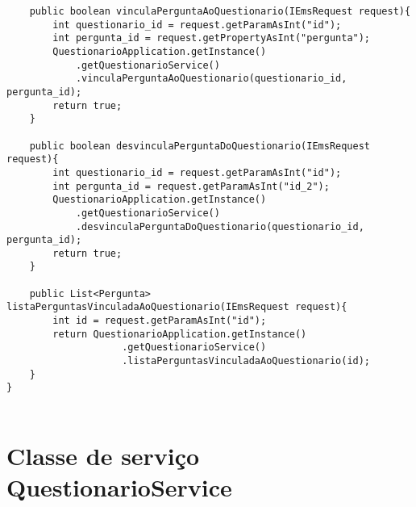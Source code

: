 \begin{lstlisting}
	public boolean vinculaPerguntaAoQuestionario(IEmsRequest request){
		int questionario_id = request.getParamAsInt("id");
		int pergunta_id = request.getPropertyAsInt("pergunta");
		QuestionarioApplication.getInstance()
			.getQuestionarioService()
			.vinculaPerguntaAoQuestionario(questionario_id, pergunta_id);
		return true;
	}
	
	public boolean desvinculaPerguntaDoQuestionario(IEmsRequest request){
		int questionario_id = request.getParamAsInt("id");
		int pergunta_id = request.getParamAsInt("id_2");
		QuestionarioApplication.getInstance()
			.getQuestionarioService()
			.desvinculaPerguntaDoQuestionario(questionario_id, pergunta_id);
		return true;
	}

	public List<Pergunta> listaPerguntasVinculadaAoQuestionario(IEmsRequest request){
		int id = request.getParamAsInt("id");
		return QuestionarioApplication.getInstance()
					.getQuestionarioService()
					.listaPerguntasVinculadaAoQuestionario(id);
	}
}


\end{lstlisting}


\section{Classe de serviço QuestionarioService}

